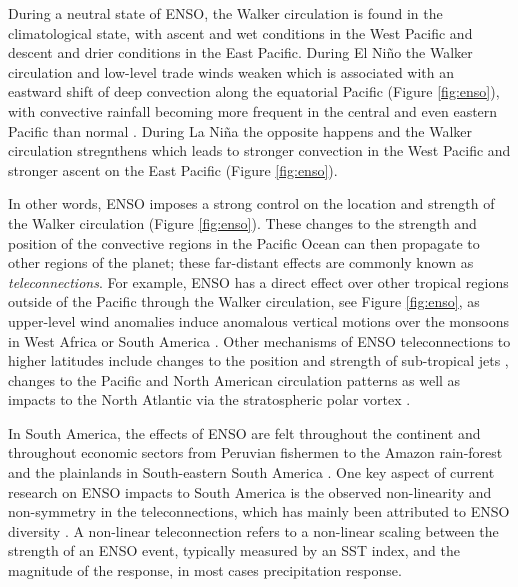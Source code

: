 During a neutral state of ENSO, the Walker circulation is found in the climatological state, with ascent and wet conditions in the West Pacific  and descent and drier conditions in the East Pacific. During El Niño the Walker circulation and low-level trade winds weaken which is associated with an eastward shift of deep convection along the equatorial Pacific (Figure \ref{fig:enso}), with convective rainfall becoming more frequent in the central and even eastern Pacific than normal \citep{neelin1998,wang2004}. During La Niña the opposite happens and the Walker circulation stregnthens which leads to stronger convection in the West Pacific and stronger ascent on the East Pacific (Figure \ref{fig:enso}). 


In other words, ENSO imposes a strong control on the location and strength of the Walker circulation (Figure \ref{fig:enso}). These changes to the strength and position of the convective regions in the Pacific Ocean can then propagate to other regions of the planet; these far-distant effects are commonly known as \textit{teleconnections}.  
For example, ENSO has a direct effect over other tropical regions outside of the Pacific through the Walker circulation, see Figure \ref{fig:enso}, as upper-level wind anomalies induce anomalous vertical motions over the monsoons in West Africa \citep{ropelewski1986,ropelewski1987} or South America \citep{sulca2018}.  
  Other mechanisms of ENSO teleconnections to higher latitudes include changes to the position and strength of sub-tropical jets \citep{fereday2020}, changes to the Pacific and North American circulation patterns \citep{bayr2019} as well as impacts to the North Atlantic via the stratospheric polar vortex \citep{domeisen2019}.
  
  In South America, the effects of ENSO are felt throughout the continent and throughout economic sectors from Peruvian fishermen \citep{takahashi2004} to the Amazon rain-forest and the plainlands in South-eastern South America \citep{grimm2011,marengo2012}. 
  One key aspect of current research on ENSO impacts to South America is the observed non-linearity and non-symmetry in the teleconnections, which has mainly been attributed to ENSO diversity \citep{tedeschi2015,cai2020}.
A non-linear teleconnection refers to a non-linear scaling between the strength of an ENSO event, typically measured by an SST index, and the magnitude of the response, in most cases precipitation response. %

